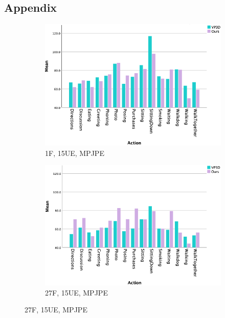 \documentclass[10pt,twocolumn,letterpaper]{article}
\begin{document}
\subsection{Appendix}
\clearpage
\begin{figure}
     \centering
     \begin{subfigure}[b]{0.49\textwidth}
         \centering
         \includegraphics[width=\textwidth]{mean_error_comparison.png}
         \caption{1F, 15UE, MPJPE}
         \label{fig:est_a}
     \end{subfigure}
     \hfill
     \begin{subfigure}[b]{0.49\textwidth}
         \centering
         \includegraphics[width=\textwidth]{mean_error_comparison_2.png}
         \caption{27F, 15UE, MPJPE}
         \label{fig:est_b}
     \end{subfigure}
     \quad

\end{figure}
\end{document}
